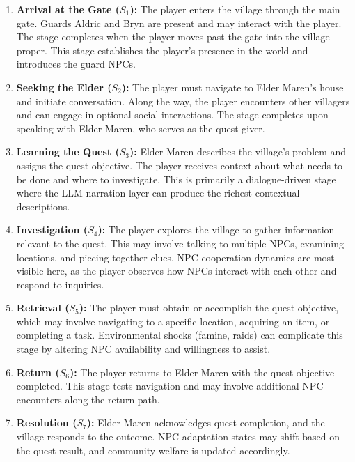\documentclass[12pt, a4paper, oneside]{report}
\begin{document}
\begin{enumerate}[nosep]
    \item \textbf{Arrival at the Gate ($S_1$):} The player enters the village through the main gate. Guards Aldric and Bryn are present and may interact with the player. The stage completes when the player moves past the gate into the village proper. This stage establishes the player's presence in the world and introduces the guard NPCs.
    \item \textbf{Seeking the Elder ($S_2$):} The player must navigate to Elder Maren's house and initiate conversation. Along the way, the player encounters other villagers and can engage in optional social interactions. The stage completes upon speaking with Elder Maren, who serves as the quest-giver.
    \item \textbf{Learning the Quest ($S_3$):} Elder Maren describes the village's problem and assigns the quest objective. The player receives context about what needs to be done and where to investigate. This is primarily a dialogue-driven stage where the LLM narration layer can produce the richest contextual descriptions.
    \item \textbf{Investigation ($S_4$):} The player explores the village to gather information relevant to the quest. This may involve talking to multiple NPCs, examining locations, and piecing together clues. NPC cooperation dynamics are most visible here, as the player observes how NPCs interact with each other and respond to inquiries.
    \item \textbf{Retrieval ($S_5$):} The player must obtain or accomplish the quest objective, which may involve navigating to a specific location, acquiring an item, or completing a task. Environmental shocks (famine, raids) can complicate this stage by altering NPC availability and willingness to assist.
    \item \textbf{Return ($S_6$):} The player returns to Elder Maren with the quest objective completed. This stage tests navigation and may involve additional NPC encounters along the return path.
    \item \textbf{Resolution ($S_7$):} Elder Maren acknowledges quest completion, and the village responds to the outcome. NPC adaptation states may shift based on the quest result, and community welfare is updated accordingly.
\end{enumerate}
\end{document}

